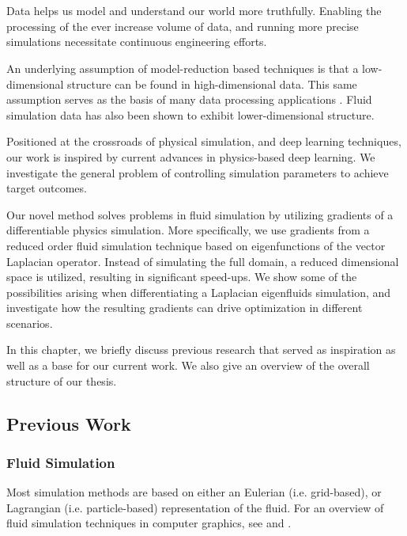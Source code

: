 \chapter{\bevezetes}

Data helps us model and understand our world more truthfully. Enabling the
processing of the ever increase volume of data, and running more precise
simulations necessitate continuous engineering efforts.

An underlying assumption of model-reduction based techniques is that
a low-dimensional structure can be found in high-dimensional data. This same
assumption serves as the basis of many data processing applications
. Fluid simulation data has
also been shown to exhibit lower-dimensional structure.


Positioned at the crossroads of physical simulation, and deep learning
techniques, our work is inspired by current advances in physics-based deep
learning. We investigate the general problem of controlling simulation
parameters to achieve target outcomes.

Our novel method solves problems in fluid simulation by utilizing gradients of
a differentiable physics simulation. More specifically, we use gradients from
a reduced order fluid simulation technique based on eigenfunctions of the vector
Laplacian operator. Instead of simulating the full domain, a reduced dimensional
space is utilized, resulting in significant speed-ups. We show some of the
possibilities arising when differentiating a Laplacian eigenfluids simulation,
and investigate how the resulting gradients can drive optimization in different
scenarios.

In this chapter, we briefly discuss previous research that served as inspiration
as well as a base for our current work. We also give an overview of the overall
structure of our thesis. 

\section{Previous Work}
\subsection{Fluid Simulation}
Most simulation methods are based on either an Eulerian (i.e.  grid-based), or
Lagrangian (i.e. particle-based) representation of the fluid.  For an overview
of fluid simulation techniques in computer graphics, see \citet{FluidNotes} and
\citet{BridsonFluid}. 

